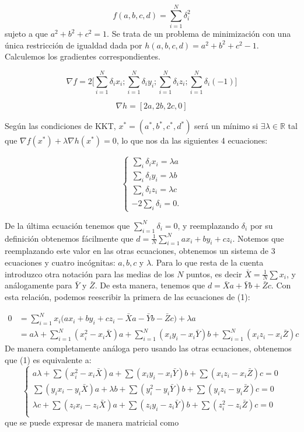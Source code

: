 \documentclass[12pt]{article}
\begin{document}
\[ f(a, b, c, d) = \sum_{i=1}^N \delta_i^2 \]
sujeto a que $a^2+b^2+c^2 = 1.$ Se trata de un problema de minimización con una única restricción de igualdad dada por $h(a,b,c,d) = a^2+b^2+c^2 - 1.$ Calculemos los gradientes correspondientes. 

\[
\nabla f = 2 \bigg[ \sum_{i=1}^N \delta_i x_i; \sum_{i=1}^N \delta_i y_i; \sum_{i=1}^N \delta_i z_i; \sum_{i=1}^N \delta_i (-1) \bigg]
\]

\[ \nabla h = [2a, 2b, 2c, 0] \]

\bigskip
Según las condiciones de KKT, $x^* = (a^*, b^*, c^*, d^*)$ será un mínimo si $\exists \lambda \in \mathbb{R}$ tal que $\nabla f(x^*) + \lambda \nabla h(x^*) = 0$, lo que nos da las siguientes 4 ecuaciones:

\begin{equation}
    \begin{cases}
          \sum_i \delta_i x_i = \lambda a \\
          \sum_i \delta_i y_i = \lambda b \\
          \sum_i \delta_i z_i = \lambda c \\
          -2 \sum_i \delta_i = 0.
    \end{cases}
\end{equation}


\bigskip
De la última ecuación tenemos que $ \sum_{i=1}^N \delta_i = 0$, y reemplazando $\delta_i$ por su definición obtenemos fácilmente que $d = \frac{1}{N} \sum_{i=1}^N ax_i + by_i + cz_i.$ Notemos que reemplazando este valor en las otras ecuaciones, obtenemos un sistema de 3 ecuaciones y cuatro incógnitas: $a, b, c$ y $\lambda$. Para lo que resta de la cuenta introduzco otra notación para las medias de los $N$ puntos, es decir $\bar{X} = \frac{1}{N} \sum x_i$, y análogamente para $\bar{Y}$ y $\bar{Z}.$ De esta manera, tenemos que $d = \bar{X}a + \bar{Y}b + \bar{Z}c$. Con esta relación, podemos reescribir la primera de las ecuaciones de (1):


\[
\begin{split}
    0
    & = \sum_{i=1}^N x_i \big( ax_i + by_i + cz_i - \bar{X}a - \bar{Y}b - \bar{Z}c \big) + \lambda a \\
    & = a \lambda + \sum_{i=1}^N (x_i^2 - x_i \bar{X}) a + \sum_{i=1}^N (x_i y_i - x_i \bar{Y}) b +  \sum_{i=1}^N (x_i z_i - x_i \bar{Z}) c 
\end{split}
\]
De manera completamente análoga pero usando las otras ecuaciones, obtenemos que (1) es equivalente a:
\[
\begin{cases}
      a \lambda + \sum (x_i^2 - x_i \bar{X}) a + \sum (x_i y_i - x_i \bar{Y}) b +  \sum (x_i z_i - x_i \bar{Z}) c = 0\\
      \sum (y_ix_i - y_i \bar{X}) a + \lambda b + \sum (y_i^2 - y_i \bar{Y}) b +  \sum (y_i z_i - y_i \bar{Z}) c  = 0\\
      \lambda c + \sum (z_ix_i - z_i \bar{X}) a + \sum (z_iy_i - z_i \bar{Y}) b + \sum (z_i^2 - z_i \bar{Z}) c = 0 \\
\end{cases}     
\]
que se puede expresar de manera matricial como
\end{document}
